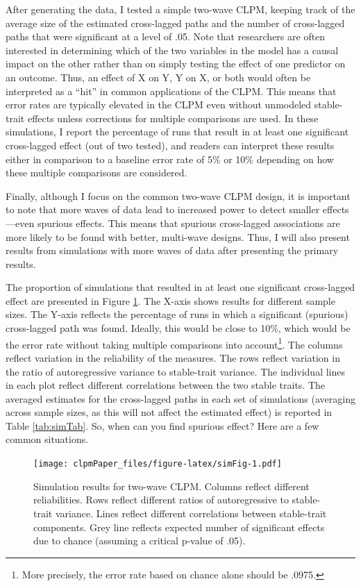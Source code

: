 \documentclass[
  english,
  man,floatsintext]{apa6}
\begin{document}
After generating the data, I tested a simple two-wave CLPM, keeping track of the average size of the estimated cross-lagged paths and the number of cross-lagged paths that were significant at a level of .05. Note that researchers are often interested in determining which of the two variables in the model has a causal impact on the other rather than on simply testing the effect of one predictor on an outcome. Thus, an effect of X on Y, Y on X, or both would often be interpreted as a ``hit'' in common applications of the CLPM. This means that error rates are typically elevated in the CLPM even without unmodeled stable-trait effects unless corrections for multiple comparisons are used. In these simulations, I report the percentage of runs that result in at least one significant cross-lagged effect (out of two tested), and readers can interpret these results either in comparison to a baseline error rate of 5\% or 10\% depending on how these multiple comparisons are considered.

Finally, although I focus on the common two-wave CLPM design, it is important to note that more waves of data lead to increased power to detect smaller effects---even spurious effects. This means that spurious cross-lagged associations are more likely to be found with better, multi-wave designs. Thus, I will also present results from simulations with more waves of data after presenting the primary results.

The proportion of simulations that resulted in at least one significant cross-lagged effect are presented in Figure \ref{fig:simFig}. The X-axis shows results for different sample sizes. The Y-axis reflects the percentage of runs in which a significant (spurious) cross-lagged path was found. Ideally, this would be close to 10\%, which would be the error rate without taking multiple comparisons into account\footnote{More precisely, the error rate based on chance alone should be .0975.}. The columns reflect variation in the reliability of the measures. The rows reflect variation in the ratio of autoregressive variance to stable-trait variance. The individual lines in each plot reflect different correlations between the two stable traits. The averaged estimates for the cross-lagged paths in each set of simulations (averaging across sample sizes, as this will not affect the estimated effect) is reported in Table \ref{tab:simTab}. So, when can you find spurious effect? Here are a few common situations.

\begin{figure}
\centering
\texttt{[image: clpmPaper\_files/figure-latex/simFig-1.pdf]}
\caption{\label{fig:simFig}Simulation results for two-wave CLPM. Columns reflect different reliabilities. Rows reflect different ratios of autoregressive to stable-trait variance. Lines reflect different correlations between stable-trait components. Grey line reflects expected number of significant effects due to chance (assuming a critical p-value of .05).}
\end{figure}
\end{document}
